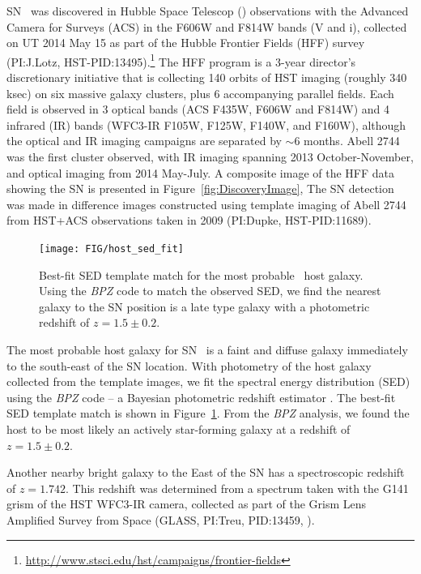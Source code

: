 SN \tomas\ was discovered in Hubble Space Telescop (\HST) observations
with the Advanced Camera for Surveys (ACS) in the F606W and F814W
bands (V and i), collected on UT 2014 May 15 as part of the Hubble
Frontier Fields (HFF) survey (PI:J.Lotz,
HST-PID:13495).\footnote{\url{http://www.stsci.edu/hst/campaigns/frontier-fields}}
The HFF program is a 3-year director's discretionary initiative that
is collecting 140 orbits of HST imaging (roughly 340 ksec) on six
massive galaxy clusters, plus 6 accompanying parallel fields.  Each
field is observed in 3 optical bands (ACS F435W, F606W and F814W) and
4 infrared (IR) bands (WFC3-IR F105W, F125W, F140W, and F160W),
although the optical and IR imaging campaigns are separated by $\sim$6
months. Abell 2744 was the first cluster observed, with IR imaging
spanning 2013 October-November, and optical imaging from 2014
May-July.  A composite image of the HFF data showing the SN is
presented in Figure~\ref{fig:DiscoveryImage},   The SN detection was made in
difference images constructed using template imaging of Abell 2744
from HST+ACS observations taken in 2009 (PI:Dupke, HST-PID:11689).





\begin{figure}
\begin{center}
\texttt{[image: FIG/host\_sed\_fit]}
\caption{  \label{fig:HostSED}
Best-fit SED template match for the most probable \tomas\ host
galaxy. Using the {\it BPZ} code to match the observed SED, we find
the nearest galaxy to the SN position is a late type galaxy with a
photometric redshift of $z=1.5\pm0.2$.}
\end{center}
\end{figure}

The most probable host galaxy for SN \tomas\ is a faint and diffuse
galaxy immediately to the south-east of the SN location.  With
photometry of the host galaxy collected from the template images, we
fit the spectral energy distribution (SED) using the {\it BPZ} code --
a Bayesian photometric redshift estimator \citep{Benitez:2000}. The
best-fit SED template match is shown in Figure~\ref{fig:HostSED}.
From the {\it BPZ} analysis, we found the host to be most likely an
actively star-forming galaxy at a redshift of $z=1.5\pm0.2$.  

Another nearby bright galaxy to the East of the SN has a spectroscopic
redshift of $z=1.742$.  This redshift was determined from a spectrum
taken with the G141 grism of the HST WFC3-IR camera, collected as part
of the Grism Lens Amplified Survey from Space (GLASS, PI:Treu,
PID:13459, \citealt{Treu:2015}). 

